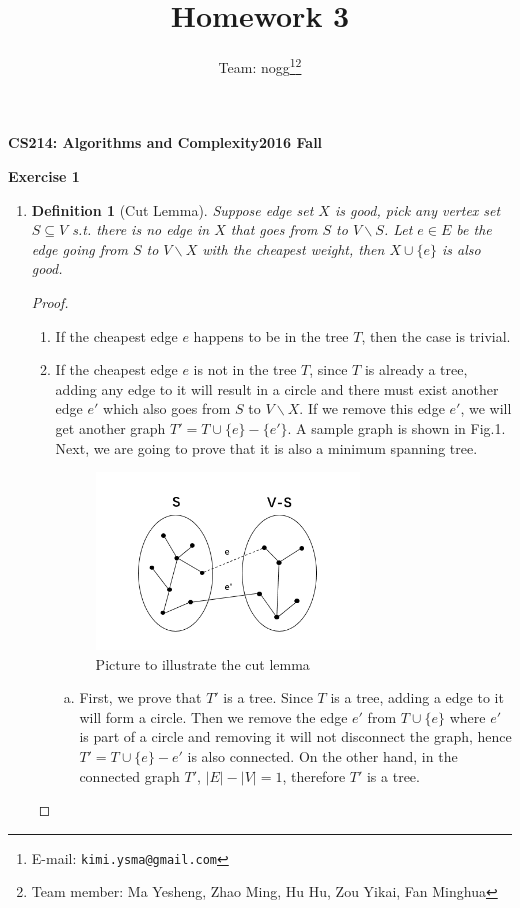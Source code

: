 \documentclass[12pt, notitlepage]{article}
\title{Homework 3}
\author{Team: nogg\footnote{E-mail: \texttt{kimi.ysma@gmail.com}}\footnote{Team member: Ma Yesheng, Zhao Ming, Hu Hu, Zou Yikai, Fan Minghua}}
\newtheorem{defi}{Definition}
\begin{document}
{\bf\small CS214: Algorithms and Complexity}\hfill{\bf\small 2016 Fall}
{\let\newpage\relax\maketitle}


\textbf{Exercise 1}
\begin{enumerate}
\item
\begin{defi}[Cut Lemma]
\vspace{-0.85cm}
Suppose edge set $X$ is good, pick any vertex set $S\subseteq V$ s.t. there is no edge in $X$ that goes from $S$ to $V\backslash S$. Let $e\in E$ be the edge going from $S$ to  $V\backslash X$ with the cheapest weight, then $X\cup \{e\}$ is also good.
\end{defi}
\begin{proof}
	\mbox{ }
\begin{enumerate}[(1)]
	\item If the cheapest edge $e$ happens to be in the tree $T$, then the case is trivial.
	\item If the cheapest edge $e$ is not in the tree $T$, since $T$ is already a tree, adding any edge to it will result in a circle and there must exist another edge $e'$ which also goes from $S$ to  $V\backslash X$. If we remove this edge $e'$, we will get another graph $T' = T\cup \{e\} -\{e'\}$. A sample graph is shown in Fig.1. Next, we are going to prove that it is also a minimum spanning tree.
	\begin{figure}[H]\centering
	\includegraphics[width=7cm]{1.png}
	\caption{Picture to illustrate the cut lemma}
	\end{figure}
	\begin{enumerate}[(a)]
		\item First, we prove that $T'$ is a tree. Since $T$ is a tree, adding a edge to it will form a circle. Then we remove the  edge $e'$ from $T\cup\{e\}$ where $e'$ is part of a circle and removing it will not disconnect the graph, hence $T' = T\cup\{e\} - e'$ is also connected. On the other hand, in the connected graph $T'$, $|E|-|V| = 1$, therefore $T'$ is a tree.

\end{enumerate}
\end{enumerate}
\end{proof}
\end{enumerate}
\end{document}
